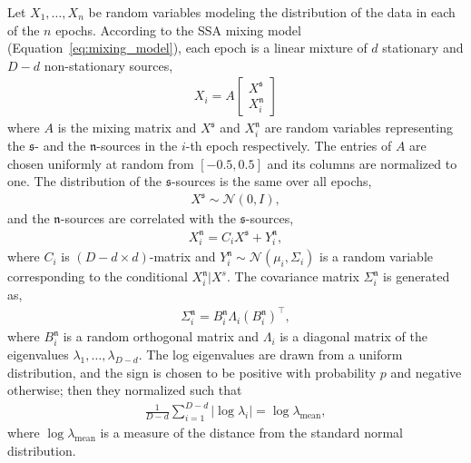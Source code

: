 \documentclass{article}
\newcommand{\N}{\ensuremath{\mathcal{N}}}
\newcommand{\1}{\ensuremath{\mathds{1}}}
\newcommand{\s}{\ensuremath{\mathfrak{s}}}
\newcommand{\n}{\ensuremath{\mathfrak{n}}}
\newcommand{\0}{\ensuremath{0}}
\begin{document}
Let $X_1, \ldots, X_n$ be random variables modeling the distribution of the data in each of 
the $n$ epochs. According to the SSA mixing model (Equation~\ref{eq:mixing_model}), each 
epoch is a linear mixture of $d$ stationary and $D-d$ non-stationary sources, 
\begin{align*}
	X_i = A \begin{bmatrix} X^\s \\ X^\n_i \end{bmatrix}
\end{align*}
where $A$ is the mixing matrix and $X^\s$ and $X^\n_i$ are random variables representing 
the \s- and the \n-sources in the $i$-th epoch respectively. The entries of $A$ are chosen 
uniformly at random from $[-0.5, 0.5]$ and its columns are normalized to one. The distribution
of the \s-sources is the same over all epochs, 
\begin{align*}
	X^\s \sim \N(0,I), 
\end{align*}
and the \n-sources are correlated with the \s-sources, 
\begin{align*}
	X^\n_i = C_i X^\s + Y^\n_i,  
\end{align*}
where $C_i$ is $(D-d \times d)$-matrix and $Y^\n_i \sim \N(\mu_i, \Sigma_i)$ is a
random variable corresponding to the conditional $X^\n_i | X^s$. The covariance 
matrix $\Sigma^\n_i$ is generated as, 
\begin{align*}
	\Sigma^\n_i = B^\n_i \Lambda_i (B^\n_i)^\top,
\end{align*}
where $B^\n_i$ is a random orthogonal matrix and $\Lambda_i$ is a diagonal matrix of 
the eigenvalues $\lambda_1, \ldots, \lambda_{D-d}$. The log eigenvalues 
are drawn from a uniform distribution, and the sign is chosen to be positive 
with probability $p$ and negative otherwise; then they normalized such that 
\begin{align*}
	\frac{1}{D-d} \sum_{i=1}^{D-d} | \log \lambda_i | = \log \lambda_{\text{mean}}, 
\end{align*}
where $\log \lambda_{\text{mean}}$ is a measure of the distance from the standard normal
distribution.
\end{document}
